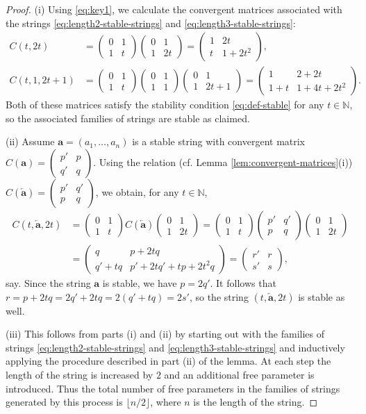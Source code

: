 \documentclass[10pt]{article}
\theoremstyle{definition}
\numberwithin{equation}{section}
\numberwithin{lemma}{section}
\newcommand{\NN}{\mathbb{N}}
\newcommand{\bfa}{\mathbf{a}}
\newcommand{\bfar}{\overleftarrow{\bfa}}
\newcommand{\mat}[1]{\begin{pmatrix} 0 & 1\\ 1 & #1\end{pmatrix}}
\begin{document}
\begin{proof}
(i) Using \eqref{eq:key1}, we calculate 
the convergent matrices associated with the strings
\eqref{eq:length2-stable-strings} and
\eqref{eq:length3-stable-strings}:
\begin{align*}
C(t,2t)&=\mat{t}\mat{2t}=\begin{pmatrix} 1&2t\\ t & 1 + 2t^2\end{pmatrix},
\\
C(t,1,2t+1)&=\mat{t}\mat{1}\mat{2t+1}
=\begin{pmatrix} 1&2+2t\\ 1+t & 1 + 4t+2t^2\end{pmatrix}.
\end{align*}
Both of these matrices satisfy the stability condition  \eqref{eq:def-stable}
for any $t\in\NN$, so the associated families of strings are stable as
claimed. 

\medskip
(ii) 
Assume $\bfa=(a_1,\dots,a_n)$ is a stable string with convergent matrix
$C(\bfa)=\left(\begin{smallmatrix} p'&p\\q'&q\end{smallmatrix}\right)$.
Using the relation (cf. Lemma \ref{lem:convergent-matrices}(i))
$C(\bfar)= \left(\begin{smallmatrix}
p'&q'\\p&q\end{smallmatrix}\right)$,
we obtain, for any $t\in\NN$,
\begin{align*}
C(t,\bfar,2t)&=\mat{t}C(\bfar)\mat{2t}
=\mat{t}\begin{pmatrix} p'&q'\\p&q\end{pmatrix}\mat{2t}
\\
&=\begin{pmatrix}q & p+2tq \\ q'+tq & p'+2tq' + tp +2t^2q\end{pmatrix}
=\begin{pmatrix} r'&r\\s'&s\end{pmatrix},
\end{align*}
say.   Since the string $\bfa$ is stable, we have $p=2q'$. It follows that 
$r=p+2tq=2q'+2tq=2(q'+tq)=2s'$,
so the string $(t,\bfar,2t)$ is stable as well.

\medskip
(iii) This follows from parts (i) and (ii) 
by starting out with the families of strings 
\eqref{eq:length2-stable-strings} and
\eqref{eq:length3-stable-strings} and inductively applying the
procedure described in part (ii) of the lemma. At each step the length of
the string is increased by $2$ and an additional free parameter is
introduced.  Thus the total number of free parameters in the families
of strings generated by this process is $\lfloor n/2\rfloor$, where $n$
is the length of the string. 
\end{proof}
\end{document}
